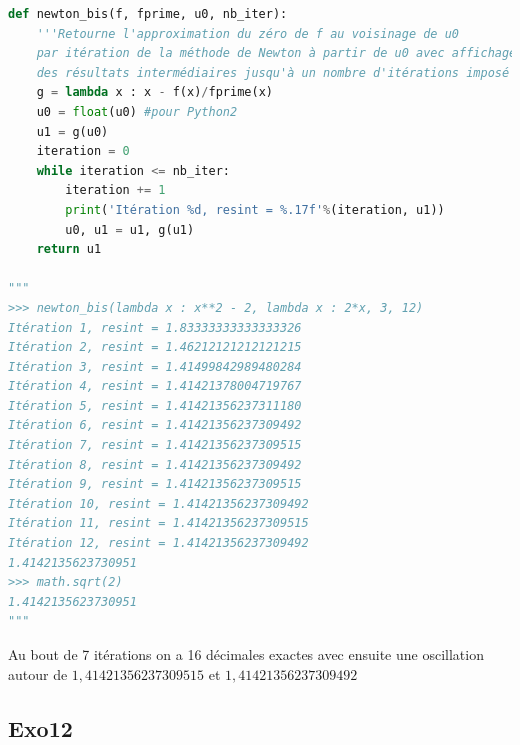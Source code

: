 \documentclass[
  11pt,
]{article}
\newcounter{exo}
\newcounter{def}
\begin{document}
\begin{lstlisting}[language=Python]
def newton_bis(f, fprime, u0, nb_iter):
    '''Retourne l'approximation du zéro de f au voisinage de u0
    par itération de la méthode de Newton à partir de u0 avec affichage
    des résultats intermédiaires jusqu'à un nombre d'itérations imposé'''
    g = lambda x : x - f(x)/fprime(x)
    u0 = float(u0) #pour Python2
    u1 = g(u0)
    iteration = 0
    while iteration <= nb_iter:
        iteration += 1  
        print('Itération %d, resint = %.17f'%(iteration, u1))   
        u0, u1 = u1, g(u1) 
    return u1

"""
>>> newton_bis(lambda x : x**2 - 2, lambda x : 2*x, 3, 12)
Itération 1, resint = 1.83333333333333326
Itération 2, resint = 1.46212121212121215
Itération 3, resint = 1.41499842989480284
Itération 4, resint = 1.41421378004719767
Itération 5, resint = 1.41421356237311180
Itération 6, resint = 1.41421356237309492
Itération 7, resint = 1.41421356237309515
Itération 8, resint = 1.41421356237309492
Itération 9, resint = 1.41421356237309515
Itération 10, resint = 1.41421356237309492
Itération 11, resint = 1.41421356237309515
Itération 12, resint = 1.41421356237309492
1.4142135623730951
>>> math.sqrt(2)
1.4142135623730951
"""
\end{lstlisting}

Au bout de 7 itérations on a 16 décimales exactes avec ensuite une
oscillation autour de \(1,41421356237309515\) et \(1,41421356237309492\)

\hypertarget{exo12}{%
\subsection{Exo12}\label{exo12}}
\end{document}
